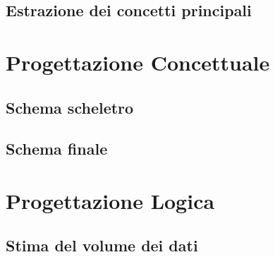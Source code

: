 \documentclass[a4paper, 12pt]{report}
\begin{document}
\section{Estrazione dei concetti principali}

\chapter{Progettazione Concettuale}

\section{Schema scheletro}

\section{Schema finale}

\chapter{Progettazione Logica}

\section{Stima del volume dei dati}
\end{document}
